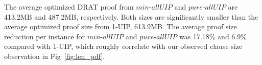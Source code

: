 \documentclass[runningheads]{llncs}
\newcommand{\allUip}{\textit{stable-allUIP}}
\newcommand{\allUipPure}{\textit{pure-allUIP}\xspace}
\newcommand{\allUipMin}{\textit{min-allUIP}\xspace}
\newcommand{\allUipAct}{\textit{allUIP-Active}}
\newcommand{\allUipIn}{\textit{allUIP-Inclusive}}
\newcommand{\allUipEx}{\textit{allUIP-Exclusive}}
\newcommand{\MapleBase}{\textit{MapleCOMSPS\_LRB}}
\newcommand{\MapleIUIPPure}{\text{Maple-\allUipPure}}
\newcommand{\MapleIUIMin}{\text{Maple-\allUipMin}}
\begin{document}
The average optimized DRAT proof from $\allUipMin$ and $\allUipPure$
are 413.2MB and 487.2MB, respectively. Both sizes are significantly
smaller than the average optimized proof size from 1-UIP, 613.9MB.
The average proof size reduction per instance for $\allUipMin$ and
$\allUipPure$ was 17.18\% and 6.9\% compared with 1-UIP, which roughly
correlate with our observed clause size observation in
Fig~\ref{fig:len_pdf}.




\end{document}
